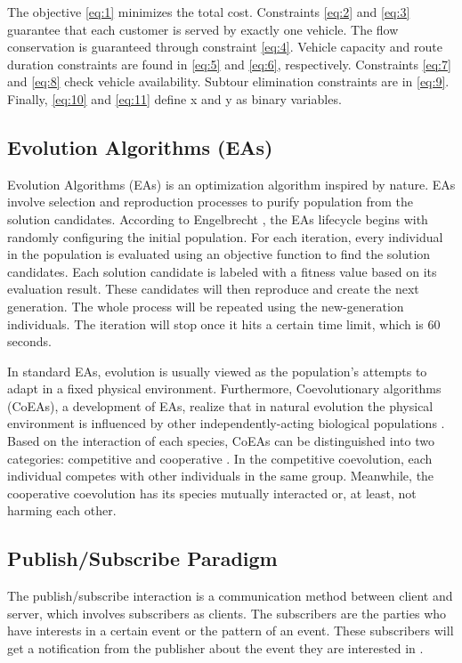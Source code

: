 \documentclass[conference]{IEEEtran}
\begin{document}
The objective \ref{eq:1} minimizes the total cost. Constraints \ref{eq:2} and \ref{eq:3} guarantee that each customer is served by exactly one vehicle. The flow conservation is guaranteed through constraint \ref{eq:4}. Vehicle capacity and route duration constraints are found in \ref{eq:5} and \ref{eq:6}, respectively. Constraints \ref{eq:7} and \ref{eq:8} check vehicle availability. Subtour elimination constraints are in \ref{eq:9}. Finally, \ref{eq:10} and \ref{eq:11} define x and y as binary variables.


\subsection{Evolution Algorithms (EAs)}
\label{ssec:evolution-algorithms}
Evolution Algorithms (EAs) is an optimization algorithm inspired by nature. EAs involve selection and reproduction processes to purify population from the solution candidates. According to Engelbrecht \cite{engelbrecht_coevolution_2007}, the EAs lifecycle begins with randomly configuring the initial population. For each iteration, every individual in the population is evaluated using an objective function to find the solution candidates. Each solution candidate is labeled with a fitness value based on its evaluation result. These candidates will then reproduce and create the next generation. The whole process will be repeated using the new-generation individuals. The iteration will stop once it hits a certain time limit, which is 60 seconds. 


In standard EAs, evolution is usually viewed as the population's attempts to adapt in a fixed physical environment. Furthermore, Coevolutionary algorithms (CoEAs), a development of EAs, realize that in natural evolution the physical environment is influenced by other independently-acting biological populations \cite{engelbrecht_coevolution_2007}. Based on the interaction of each species, CoEAs can be distinguished into two categories: competitive and cooperative \cite{engelbrecht_coevolution_2007}. In the competitive coevolution, each individual competes with other individuals in the same group. Meanwhile, the cooperative coevolution has its species mutually interacted or, at least, not harming each other. 


\subsection{Publish/Subscribe Paradigm}
\label{ssec:pub-sub}
The publish/subscribe interaction is a communication method between client and server, which involves subscribers as clients. The subscribers are the parties who have interests in a certain event or the pattern of an event. These subscribers will get a notification from the publisher about the event they are interested in \cite{eugster_many_2003}. 
\end{document}
